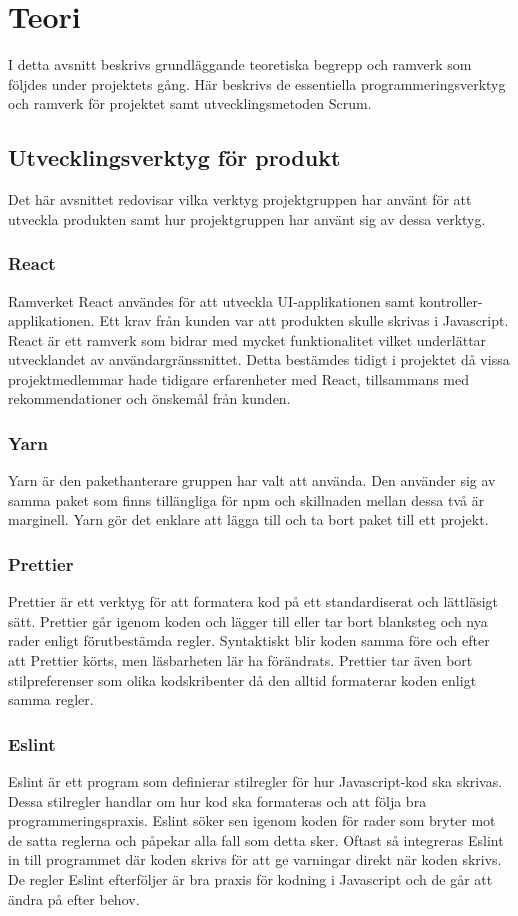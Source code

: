 \chapter{Teori}
\label{cha:theory}
I detta avsnitt beskrivs grundläggande teoretiska begrepp och ramverk som följdes under projektets gång. Här beskrivs de essentiella programmeringsverktyg och ramverk för projektet samt utvecklingsmetoden Scrum. 
\section{Utvecklingsverktyg för produkt}
Det här avsnittet redovisar vilka verktyg projektgruppen har använt för att utveckla produkten samt hur projektgruppen har använt sig av dessa verktyg.

\subsection*{React}
Ramverket React användes för att utveckla UI-applikationen samt kontroller-applikationen.\cite{React} Ett krav från kunden var att produkten skulle skrivas i Javascript. React är ett ramverk som bidrar med mycket funktionalitet vilket underlättar utvecklandet av användargränssnittet.  Detta bestämdes tidigt i projektet då vissa projektmedlemmar hade tidigare erfarenheter med React, tillsammans med rekommendationer och önskemål från kunden.

\subsection*{Yarn}
Yarn är den pakethanterare gruppen har valt att använda.\cite{Yarn} Den använder sig av samma paket som finns tillängliga för npm och skillnaden mellan dessa två är marginell. Yarn gör det enklare att lägga till och ta bort paket till ett projekt.

\subsection*{Prettier}
Prettier är ett verktyg för att formatera kod på ett standardiserat och lättläsigt sätt.\cite{prettier} Prettier går igenom koden och lägger till eller tar bort blanksteg och nya rader enligt förutbestämda regler. Syntaktiskt blir koden samma före och efter att Prettier körts, men läsbarheten lär ha förändrats. Prettier tar även bort stilpreferenser som olika kodskribenter då den alltid formaterar koden enligt samma regler.


\subsection*{Eslint}
Eslint är ett program som definierar stilregler för hur Javascript-kod ska skrivas.\cite{eslint} Dessa stilregler handlar om hur kod ska formateras och att följa bra programmeringspraxis. Eslint söker sen igenom koden för rader som bryter mot de satta reglerna och påpekar alla fall som detta sker. Oftast så integreras Eslint in till programmet där koden skrivs för att ge varningar direkt när koden skrivs. De regler Eslint efterföljer är bra praxis för kodning i Javascript och de går att ändra på efter behov.


